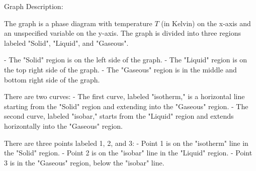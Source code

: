 Graph Description:

The graph is a phase diagram with temperature \( T \) (in Kelvin) on the x-axis and an unspecified variable on the y-axis. The graph is divided into three regions labeled "Solid", "Liquid", and "Gaseous". 

- The "Solid" region is on the left side of the graph.
- The "Liquid" region is on the top right side of the graph.
- The "Gaseous" region is in the middle and bottom right side of the graph.

There are two curves:
- The first curve, labeled "isotherm," is a horizontal line starting from the "Solid" region and extending into the "Gaseous" region.
- The second curve, labeled "isobar," starts from the "Liquid" region and extends horizontally into the "Gaseous" region.

There are three points labeled 1, 2, and 3:
- Point 1 is on the "isotherm" line in the "Solid" region.
- Point 2 is on the "isobar" line in the "Liquid" region.
- Point 3 is in the "Gaseous" region, below the "isobar" line.